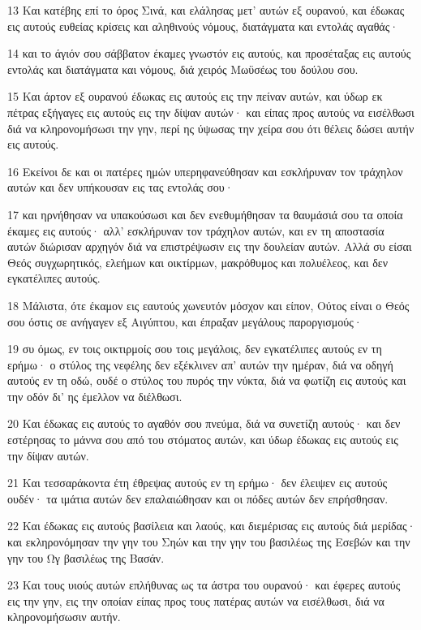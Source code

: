 \par 13 Και κατέβης επί το όρος Σινά, και ελάλησας μετ' αυτών εξ ουρανού, και έδωκας εις αυτούς ευθείας κρίσεις και αληθινούς νόμους, διατάγματα και εντολάς αγαθάς·
\par 14 και το άγιόν σου σάββατον έκαμες γνωστόν εις αυτούς, και προσέταξας εις αυτούς εντολάς και διατάγματα και νόμους, διά χειρός Μωϋσέως του δούλου σου.
\par 15 Και άρτον εξ ουρανού έδωκας εις αυτούς εις την πείναν αυτών, και ύδωρ εκ πέτρας εξήγαγες εις αυτούς εις την δίψαν αυτών· και είπας προς αυτούς να εισέλθωσι διά να κληρονομήσωσι την γην, περί ης ύψωσας την χείρα σου ότι θέλεις δώσει αυτήν εις αυτούς.
\par 16 Εκείνοι δε και οι πατέρες ημών υπερηφανεύθησαν και εσκλήρυναν τον τράχηλον αυτών και δεν υπήκουσαν εις τας εντολάς σου·
\par 17 και ηρνήθησαν να υπακούσωσι και δεν ενεθυμήθησαν τα θαυμάσιά σου τα οποία έκαμες εις αυτούς· αλλ' εσκλήρυναν τον τράχηλον αυτών, και εν τη αποστασία αυτών διώρισαν αρχηγόν διά να επιστρέψωσιν εις την δουλείαν αυτών. Αλλά συ είσαι Θεός συγχωρητικός, ελεήμων και οικτίρμων, μακρόθυμος και πολυέλεος, και δεν εγκατέλιπες αυτούς.
\par 18 Μάλιστα, ότε έκαμον εις εαυτούς χωνευτόν μόσχον και είπον, Ούτος είναι ο Θεός σου όστις σε ανήγαγεν εξ Αιγύπτου, και έπραξαν μεγάλους παροργισμούς·
\par 19 συ όμως, εν τοις οικτιρμοίς σου τοις μεγάλοις, δεν εγκατέλιπες αυτούς εν τη ερήμω· ο στύλος της νεφέλης δεν εξέκλινεν απ' αυτών την ημέραν, διά να οδηγή αυτούς εν τη οδώ, ουδέ ο στύλος του πυρός την νύκτα, διά να φωτίζη εις αυτούς και την οδόν δι' ης έμελλον να διέλθωσι.
\par 20 Και έδωκας εις αυτούς το αγαθόν σου πνεύμα, διά να συνετίζη αυτούς· και δεν εστέρησας το μάννα σου από του στόματος αυτών, και ύδωρ έδωκας εις αυτούς εις την δίψαν αυτών.
\par 21 Και τεσσαράκοντα έτη έθρεψας αυτούς εν τη ερήμω· δεν έλειψεν εις αυτούς ουδέν· τα ιμάτια αυτών δεν επαλαιώθησαν και οι πόδες αυτών δεν επρήσθησαν.
\par 22 Και έδωκας εις αυτούς βασίλεια και λαούς, και διεμέρισας εις αυτούς διά μερίδας· και εκληρονόμησαν την γην του Σηών και την γην του βασιλέως της Εσεβών και την γην του Ωγ βασιλέως της Βασάν.
\par 23 Και τους υιούς αυτών επλήθυνας ως τα άστρα του ουρανού· και έφερες αυτούς εις την γην, εις την οποίαν είπας προς τους πατέρας αυτών να εισέλθωσι, διά να κληρονομήσωσιν αυτήν.
